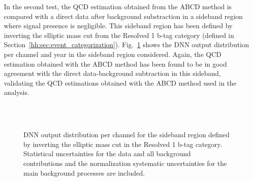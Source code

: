 \documentclass[../main.tex]{subfiles}
\begin{document}
In the second test, the QCD estimation obtained from the ABCD method is compared with a direct data after background substraction in a sideband region where signal presence is negligible. This sideband region has been defined by inverting the elliptic mass cut from the Resolved 1 b-tag category (defined in Section~\ref{hh:sec:event_categorization}). Fig.~\ref{hh:fig:qcd_test2_dnn} shows the DNN output distribution per channel and year in the sideband region considered. Again, the QCD estimation obtained with the ABCD method has been found to be in good agreement with the direct data-background subtraction in this sideband, validating the QCD estimations obtained with the ABCD method used in the analysis.

\begin{figure}
\centering
{}
\\
\\
    \caption[QCD estimation - Second validity test]{DNN output distribution per channel for the sideband region defined by inverting the elliptic mass cut in the Resolved 1 b-tag category.  Statistical uncertainties for the data and all background contributions and the normalization systematic uncertainties for the main background processes are included.}
    \label{hh:fig:qcd_test2_dnn}
\end{figure}
\end{document}
